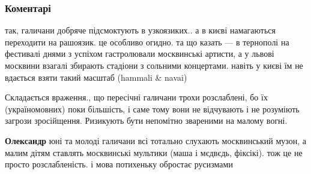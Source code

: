  
 
 
 
 
\subsubsection{Коментарі}

\begin{itemize}
 

так, галичани добряче підсмоктують в узкоязиких.. а в києві намагаються
переходити на рашоязик. це особливо огидно. та що казать — в тернополі на
фестивалі днями з успіхом гастролювали москвинські артисти, а у львові москвини
взагалі збирають стадіони з сольними концертами. навіть у києві їм не вдається
взяти такий масштаб (hammali \& navai)


 

Складається враження., що пересічні галичани трохи розслаблені, бо їх
(україномовних) поки більшість, і саме тому вони не відчувають і не розуміють
загрози зросійщення. Ризикують бути непомітно звареними на малому вогні.

\begin{itemize}
 

\textbf{Олександр} юні та молоді галичани всі тотально слухають москвинський музон, а
малим дітям ставлять москвинські мультики (маша і мєдвєдь, фіксікі). тож це не
просто розслабленість. і мова потихеньку обростає русизмами



\end{itemize}
\end{itemize}
